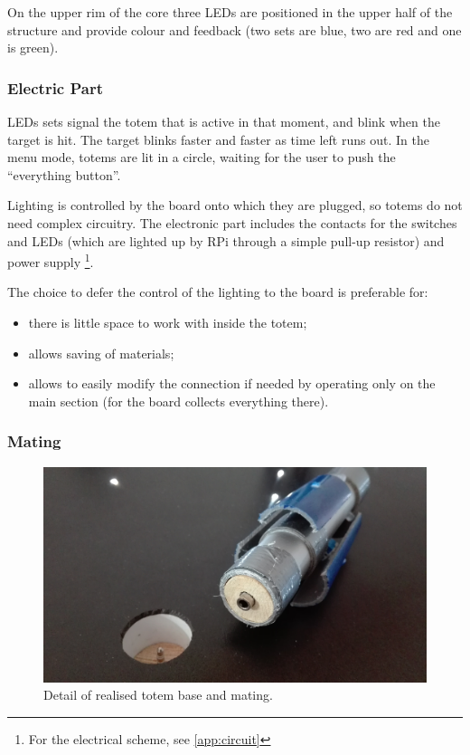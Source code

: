 \documentclass[a4paper,twoside]{book}
\begin{document}
On the upper rim of the core three LEDs are positioned in the upper half of the structure and provide colour and feedback (two sets are blue, two are red and one is green).

\subsubsection{Electric Part}
LEDs sets signal the totem that is active in that moment, and blink when the target is hit. The target blinks faster and faster as time left runs out. In the menu mode, totems are lit in a circle, waiting for the user to push the \textquotedblleft{}everything button\textquotedblright{}.

Lighting is controlled by the board onto which they are plugged, so totems do not need complex circuitry. The electronic part includes the contacts for the switches and LEDs (which are lighted up by RPi through a simple pull-up resistor) and power supply%
\footnote{For the electrical scheme, see \autoref{app:circuit}}.

\beforelist The choice to defer the control of the lighting to the board is preferable for:
\begin{itemize}
\item there is little space to work with inside the totem;
\item allows saving of materials;
\item allows to easily modify the connection if needed by operating only on the main section (for the board collects everything there).
\end{itemize}
\afterlist*

\subsubsection{Mating}

\begin{figure}[h]
\includegraphics[width=\linewidth]{img/IMG_20160616_114517} 
\caption{Detail of realised totem base and mating.}
\end{figure}
\end{document}
